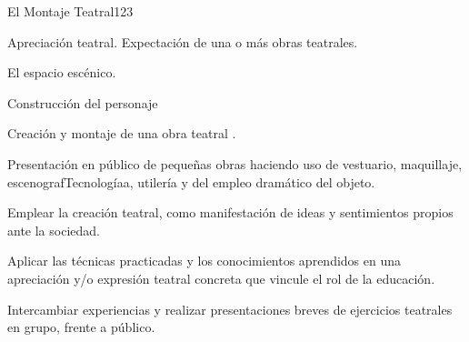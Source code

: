 \begin{syllabus}
\begin{unit}{El  Montaje Teatral}{}{12}{3}
\begin{topics}
	\item Apreciación teatral. Expectación de una o más obras teatrales.
	\item El espacio escénico.
	\item Construcción del personaje
	\item Creación y montaje de una obra teatral .
	\item Presentación en público de pequeñas obras haciendo uso de vestuario, maquillaje, escenografTecnologíaa, utilería y del empleo dramático del objeto.
\end{topics}
\begin{learningoutcomes}
	\item Emplear  la creación teatral, como manifestación de ideas y sentimientos propios ante la sociedad.
	\item Aplicar las técnicas practicadas y los conocimientos aprendidos en una apreciación y/o expresión teatral concreta que vincule el rol de la educación.
	\item Intercambiar experiencias y realizar presentaciones breves de ejercicios teatrales en grupo, frente a público.  
\end{learningoutcomes}
\end{unit}



\begin{coursebibliography}

\end{coursebibliography}
\end{syllabus}
